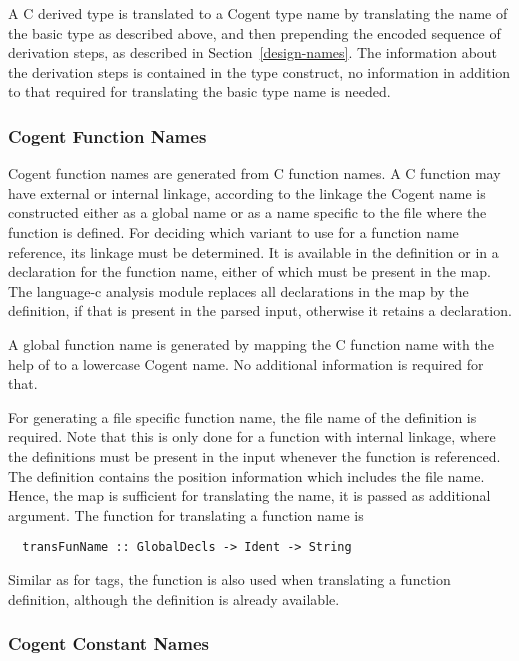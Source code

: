 A C derived type is translated to a Cogent type name by translating the name of the basic type as described
above, and then prepending the encoded sequence of derivation steps, as
described in Section~\ref{design-names}. The information about the derivation steps is contained in the 
type construct, no information in addition to that required for translating the basic type name is needed.

\subsubsection{Cogent Function Names}

Cogent function names are generated from C function names. A C function may have external or internal
linkage, according to the linkage the Cogent name is constructed either as a global name or as a name specific
to the file where the function is defined. For deciding which variant to use for a function name reference,
its linkage must be determined. It is available in the definition or in a declaration for the function name,
either of which must be present in the  map. The language-c analysis module replaces all 
declarations in the map by the
definition, if that is present in the parsed input, otherwise it retains a declaration. 

A global function name is generated by mapping the C function name with the help of  to
a lowercase Cogent name. No additional information is required for that.

For generating a file specific function name, the file name of the definition is required. Note that 
this is only done for a function with internal linkage, where the definitions must be present in
the input whenever the function is referenced. The definition contains the position information
which includes the file name. Hence, the  map is sufficient for translating the name,
it is passed as additional argument. The function for translating a function name is
\begin{verbatim}
  transFunName :: GlobalDecls -> Ident -> String
\end{verbatim}

Similar as for tags, the function is also used when translating a function definition, although the 
definition is already available.

\subsubsection{Cogent Constant Names}

